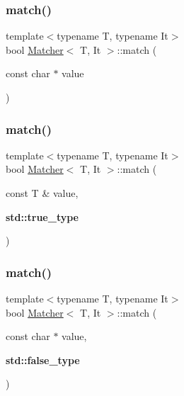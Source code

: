 \mbox{\label{class_matcher_adeb27a509701a96d922d98ade0080bcd}} 
\subsubsection{\texorpdfstring{match()}{match()}\hspace{0.1cm}{\footnotesize\ttfamily [4/6]}}
{\footnotesize\ttfamily template$<$typename T, typename It$>$ \\
bool \hyperlink{class_matcher}{Matcher}$<$ T, It $>$\+::match (\begin{DoxyParamCaption}\item[{const char $\ast$}]{value }\end{DoxyParamCaption})\hspace{0.3cm}{\ttfamily [inline]}}

\mbox{\label{class_matcher_acf713afbc98dd0b324ed04f52ccad568}} 
\subsubsection{\texorpdfstring{match()}{match()}\hspace{0.1cm}{\footnotesize\ttfamily [5/6]}}
{\footnotesize\ttfamily template$<$typename T, typename It$>$ \\
bool \hyperlink{class_matcher}{Matcher}$<$ T, It $>$\+::match (\begin{DoxyParamCaption}\item[{const T \&}]{value,  }\item[{\textbf{ std\+::true\+\_\+type}}]{ }\end{DoxyParamCaption})\hspace{0.3cm}{\ttfamily [inline]}}

\mbox{\label{class_matcher_a0abb0a8d3e921a4fe96fdd8646e7afd7}} 
\subsubsection{\texorpdfstring{match()}{match()}\hspace{0.1cm}{\footnotesize\ttfamily [6/6]}}
{\footnotesize\ttfamily template$<$typename T, typename It$>$ \\
bool \hyperlink{class_matcher}{Matcher}$<$ T, It $>$\+::match (\begin{DoxyParamCaption}\item[{const char $\ast$}]{value,  }\item[{\textbf{ std\+::false\+\_\+type}}]{ }\end{DoxyParamCaption})\hspace{0.3cm}{\ttfamily [inline]}}

